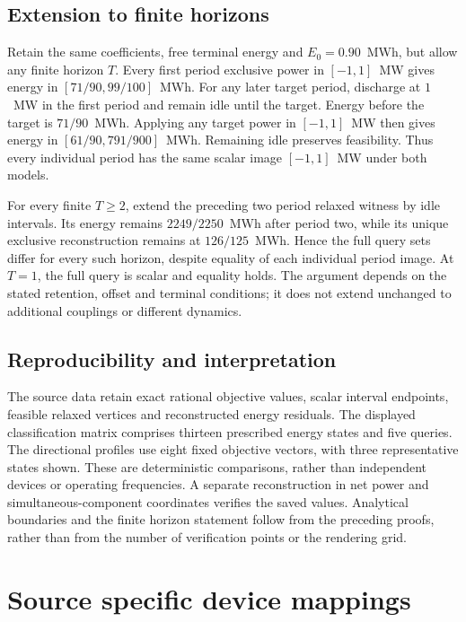 \subsection{Extension to finite horizons}
\label{si:temporal_horizon}
Retain the same coefficients, free terminal energy and $E_0=0.90$~MWh, but allow any finite horizon $T$. Every first period exclusive power in $[-1,1]$~MW gives energy in $[71/90,99/100]$~MWh. For any later target period, discharge at $1$~MW in the first period and remain idle until the target. Energy before the target is $71/90$~MWh. Applying any target power in $[-1,1]$~MW then gives energy in $[61/90,791/900]$~MWh. Remaining idle preserves feasibility. Thus every individual period has the same scalar image $[-1,1]$~MW under both models.

For every finite $T\geq2$, extend the preceding two period relaxed witness by idle intervals. Its energy remains $2249/2250$~MWh after period two, while its unique exclusive reconstruction remains at $126/125$~MWh. Hence the full query sets differ for every such horizon, despite equality of each individual period image. At $T=1$, the full query is scalar and equality holds. The argument depends on the stated retention, offset and terminal conditions; it does not extend unchanged to additional couplings or different dynamics.

\subsection{Reproducibility and interpretation}
The source data retain exact rational objective values, scalar interval endpoints, feasible relaxed vertices and reconstructed energy residuals. The displayed classification matrix comprises thirteen prescribed energy states and five queries. The directional profiles use eight fixed objective vectors, with three representative states shown. These are deterministic comparisons, rather than independent devices or operating frequencies. A separate reconstruction in net power and simultaneous-component coordinates verifies the saved values. Analytical boundaries and the finite horizon statement follow from the preceding proofs, rather than from the number of verification points or the rendering grid.


\section{Source specific device mappings}\label{sec:external}
